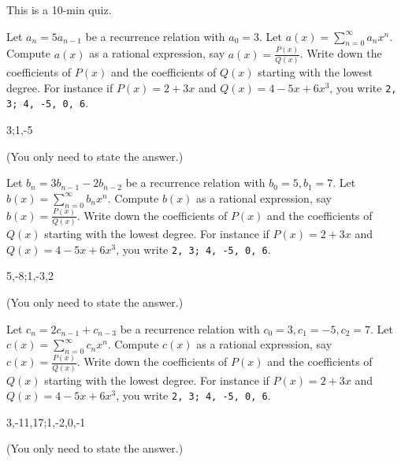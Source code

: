 

\renewcommand\AUTHOR{nweadick1@cougars.ccis.edu} %


\topmattertwo

This is a 10-min quiz.

\nextq
Let $a_n = 5a_{n-1}$ be a recurrence relation with $a_0 = 3$.
Let $a(x) = \sum_{n=0}^\infty a_n x^n$.
Compute $a(x)$ as a rational expression, say $a(x) = \frac{P(x)}{Q(x)}$.
Write down the coefficients of $P(x)$ and the coefficients of $Q(x)$
starting with the lowest degree.
For instance if $P(x) = 2 + 3x$ and $Q(x) = 4 - 5x + 6x^3$, you write
\verb!2, 3; 4, -5, 0, 6!.
\\
\ANSWER
\begin{answerlong}
3;1,-5
\end{answerlong}
(You only need to state the answer.)

\nextq
Let $b_n = 3b_{n-1} - 2b_{n-2}$ be a recurrence relation
with $b_0 = 5, b_1 = 7$.
Let $b(x) = \sum_{n=0}^\infty b_n x^n$.
Compute $b(x)$ as a rational expression, say $b(x) = \frac{P(x)}{Q(x)}$.
Write down the coefficients of $P(x)$ and the coefficients of $Q(x)$
starting with the lowest degree.
For instance if $P(x) = 2 + 3x$ and $Q(x) = 4 - 5x + 6x^3$, you write
\verb!2, 3; 4, -5, 0, 6!.
\\
\ANSWER
\begin{answerlong}
5,-8;1,-3,2
\end{answerlong}
(You only need to state the answer.)

\nextq
Let $c_n = 2c_{n-1} + c_{n-3}$ be a recurrence relation
with $c_0 = 3, c_1 = -5, c_2 = 7$.
Let $c(x) = \sum_{n=0}^\infty c_n x^n$.
Compute $c(x)$ as a rational expression, say $c(x) = \frac{P(x)}{Q(x)}$.
Write down the coefficients of $P(x)$ and the coefficients of $Q(x)$
starting with the lowest degree.
For instance if $P(x) = 2 + 3x$ and $Q(x) = 4 - 5x + 6x^3$, you write
\verb!2, 3; 4, -5, 0, 6!.
\\
\ANSWER
\begin{answerlong}
3,-11,17;1,-2,0,-1
\end{answerlong}
(You only need to state the answer.)

\newpage


